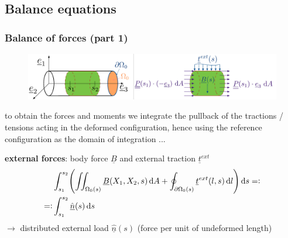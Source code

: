 \subsection{Balance equations}

\begin{frame}
  \frametitle{Balance of forces (part 1)}
  \vspace{-1em}
  \begin{figure}
    \centering
    \includegraphics[width=22cm, keepaspectratio=true]{sections/cosserat_rods/images/Forces}
  \end{figure}

  to obtain the forces and moments we integrate the pullback of the tractions / tensions acting in the deformed configuration, hence using the reference configuration as the domain of integration ...
  
  \vspace{1em}
  \textbf{external forces}: body force $\underline{B}$ and external traction $\underline{t}^{ext}$
  \begin{displaymath}
    \begin{alignedat}{1}
      &\int_{s_1}^{s_2} \Biggl( \iint_{\Omega_{0}(s)} \underline{B}(X_1,X_2,s) \dif A + \oint_{\partial \Omega_{0}(s)} \underline{t}^{ext}(l,s) \dif l \Biggr) \dif s =: \\
      =: & \int_{s_1}^{s_2} \underline{\hat{n}}(s) \dif s
    \end{alignedat}
  \end{displaymath}
  \vspace{0.5em}
  $\rightarrow$ distributed external load $\underline{\hat{n}}(s)$ (force per unit of undeformed length)
\end{frame}


